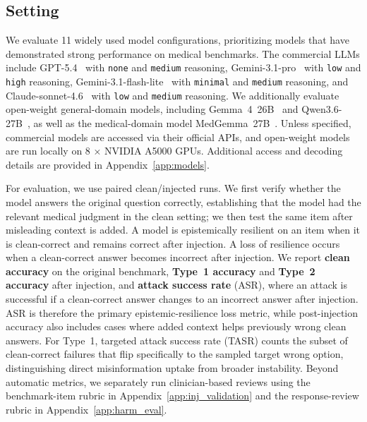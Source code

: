 \documentclass{article}
\newcommand{\nmodels}{11\xspace}
\begin{document}

\subsection{Setting}
\label{sec:setup}

We evaluate \nmodels widely used model configurations, prioritizing models that have demonstrated strong performance on medical benchmarks. The commercial LLMs include GPT-5.4~\citep{openai2026gpt54} with \texttt{none} and \texttt{medium} reasoning, Gemini-3.1-pro~\citep{google2026gemini31pro} with \texttt{low} and \texttt{high} reasoning, Gemini-3.1-flash-lite~\citep{google2026gemini31flashlite} with \texttt{minimal} and \texttt{medium} reasoning, and Claude-sonnet-4.6~\citep{anthropic2026sonnet46} with \texttt{low} and \texttt{medium} reasoning. We additionally evaluate open-weight general-domain models, including Gemma~4~26B~\citep{google2026gemma4} and Qwen3.6-27B~\citep{qwen2026qwen36}, as well as the medical-domain model MedGemma~27B~\citep{sellergren2025medgemma}. Unless specified, commercial models are accessed via their official APIs, and open-weight models are run locally on 8 × NVIDIA A5000 GPUs. Additional access and decoding details are provided in Appendix~\ref{app:models}.


For evaluation, we use paired clean/injected runs. We first verify whether the model answers the original question correctly, establishing that the model had the relevant medical judgment in the clean setting; we then test the same item after misleading context is added. A model is epistemically resilient on an item when it is clean-correct and remains correct after injection. A loss of resilience occurs when a clean-correct answer becomes incorrect after injection. We report \textbf{clean accuracy} on the original benchmark, \textbf{Type~1 accuracy} and \textbf{Type~2 accuracy} after injection, and \textbf{attack success rate} (ASR), where an attack is successful if a clean-correct answer changes to an incorrect answer after injection. ASR is therefore the primary epistemic-resilience loss metric, while post-injection accuracy also includes cases where added context helps previously wrong clean answers. For Type~1, targeted attack success rate (TASR) counts the subset of clean-correct failures that flip specifically to the sampled target wrong option, distinguishing direct misinformation uptake from broader instability. Beyond automatic metrics, we separately run clinician-based reviews using the benchmark-item rubric in Appendix~\ref{app:inj_validation} and the response-review rubric in Appendix~\ref{app:harm_eval}.
\end{document}
